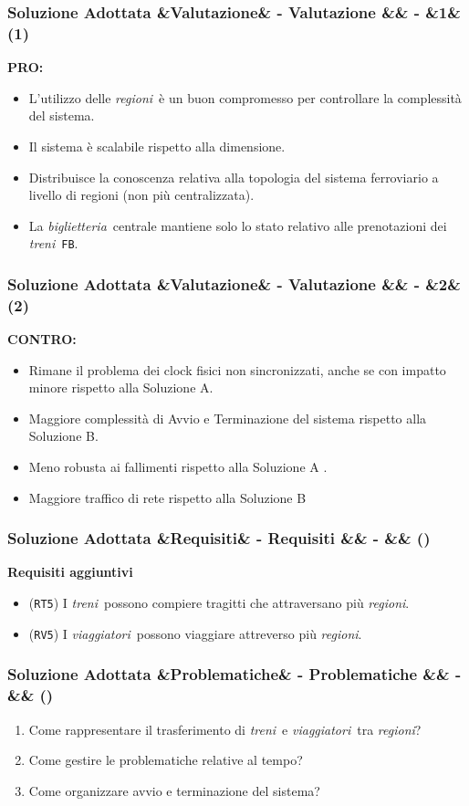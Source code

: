 \documentclass[slidestop,compress,blackandwhite]{beamer}
\newcommand{\ttt}[1]{\texttt{#1}}
\newcommand{\ii}[1]{\textit{#1}}
\newcommand{\treni}{\ii{treni}}
\newcommand{\viaggiatori}{\ii{viaggiatori}}
\newcommand{\biglietteria}{\ii{biglietteria}}
\newcommand{\regioni}{\ii{regioni}}
\newcommand{\PRO}{\textbf{PRO:}}
\newcommand{\CONTRO}{\textbf{CONTRO:}}
\newcommand{\newtitle}[4]{
	#1 
	\ifx&#2&%
	\else
  		\large- #2
	\fi
	\ifx&#3&%
	\else
  		\normalsize- #3
	\fi
	\ifx&#4&%
	\else
  		\normalsize (#4)
	\fi
}
\newcommand{\newframe}[5]{
	\begin{frame}
		\frametitle{\newtitle{#1}{#2}{#3}{#4}}
		#5
	\end{frame}
}
\newcommand{\itemt}[1]{\item (\ttt{#1})}
\begin{document}
	\newframe{Soluzione Adottata}{Valutazione}{}{1}{
		\vspace{0.5cm}
		\PRO
		\begin{itemize}
			\item L'utilizzo delle \regioni~è un buon compromesso per controllare la complessità del sistema.
			\item Il sistema è scalabile rispetto alla dimensione.
			\item Distribuisce la conoscenza relativa alla topologia del sistema ferroviario a livello di regioni (non più centralizzata).
			\item La \biglietteria~centrale mantiene solo lo stato relativo alle prenotazioni dei \treni~\ttt{FB}.
		\end{itemize}
	
	}
	
	\newframe{Soluzione Adottata}{Valutazione}{}{2}{
		\vspace{0.5cm}
		\CONTRO
		\begin{itemize}
			\item Rimane il problema dei clock fisici non sincronizzati, anche se con impatto minore rispetto alla Soluzione A.
			\item Maggiore complessità di Avvio e Terminazione del sistema rispetto alla Soluzione B.
			\item Meno robusta ai fallimenti rispetto alla Soluzione A .
			\item Maggiore traffico di rete rispetto alla Soluzione B
		\end{itemize}
	}
	
	\newframe{Soluzione Adottata}{Requisiti}{}{}{
		\vspace{0.5cm}
		\textbf{Requisiti aggiuntivi}
		\begin{itemize}
			\itemt{RT5} I \treni~possono compiere tragitti che attraversano più \regioni.
			\itemt{RV5} I \viaggiatori~possono viaggiare attreverso più \regioni.
		\end{itemize}
	}
	
	\newframe{Soluzione Adottata}{Problematiche}{}{}{
		\vspace{0.5cm}
		\begin{enumerate}
			\item Come rappresentare il trasferimento di \treni~e \viaggiatori~tra \regioni? 
			\vspace{0.4cm}
			\item Come gestire le problematiche relative al tempo?
			\vspace{0.4cm}
			\item Come organizzare avvio e terminazione del sistema?
		\end{enumerate}
	}
	
\end{document}

